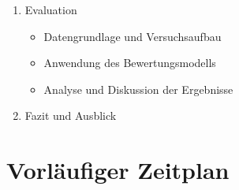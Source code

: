 \begin{enumerate}
    \item Evaluation
    \begin{itemize}
        \item Datengrundlage und Versuchsaufbau
        \item Anwendung des Bewertungsmodells
        \item Analyse und Diskussion der Ergebnisse
    \end{itemize}

    \item Fazit und Ausblick
\end{enumerate}

\chapter{Vorläufiger Zeitplan}

